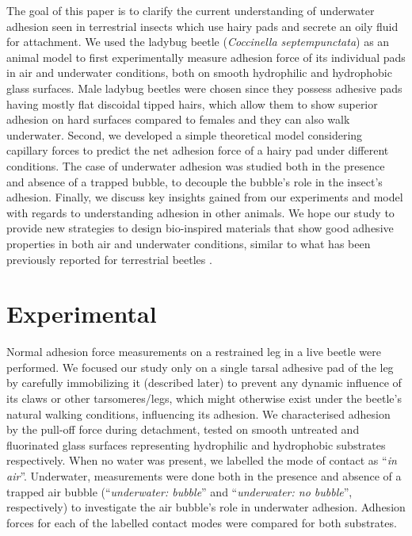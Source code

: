 \documentclass[vruler,JEB]{COB}%
\begin{document}
The goal of this paper is to clarify the current understanding of underwater adhesion seen in terrestrial insects which use hairy pads and secrete an oily fluid for attachment. We used the ladybug beetle (\emph{Coccinella septempunctata}) as an animal model to first experimentally measure adhesion force of its individual pads in air and underwater conditions, both on smooth hydrophilic and hydrophobic glass surfaces. Male ladybug beetles were chosen since they possess adhesive pads having mostly flat discoidal tipped hairs, which allow them to show superior adhesion on hard surfaces compared to females \citep{RN145} and they can also walk underwater. Second, we developed a simple theoretical model considering capillary forces to predict the net adhesion force of a hairy pad under different conditions. The case of underwater adhesion was studied both in the presence and absence of a trapped bubble, to decouple the bubble's role in the insect's adhesion. Finally, we discuss key insights gained from our experiments and model with regards to understanding adhesion in other animals. We hope our study to provide new strategies to design bio-inspired materials that show good adhesive properties in both air and underwater conditions, similar to what has been previously reported for terrestrial beetles \citep{RN87}.

\section{Experimental}

Normal adhesion force measurements on a restrained leg in a live
beetle were performed. We focused our study only on a single tarsal adhesive pad of the leg by carefully immobilizing it (described later) to prevent any dynamic influence of its claws or other tarsomeres/legs, which might otherwise exist under the beetle's natural walking conditions, influencing its adhesion. 
We characterised adhesion by the pull-off force
during detachment, tested on smooth untreated and
fluorinated glass surfaces representing hydrophilic and hydrophobic substrates
respectively. When no water was present, we labelled the mode of contact
as ``\emph{in air}''. Underwater, measurements
were done both in the presence and absence of a trapped air bubble (``\emph{underwater:
bubble}'' and ``\emph{underwater: no bubble}'', respectively) to
investigate the air bubble's role in underwater adhesion. Adhesion forces
for each of the labelled contact modes were compared for both substrates.
\end{document}
